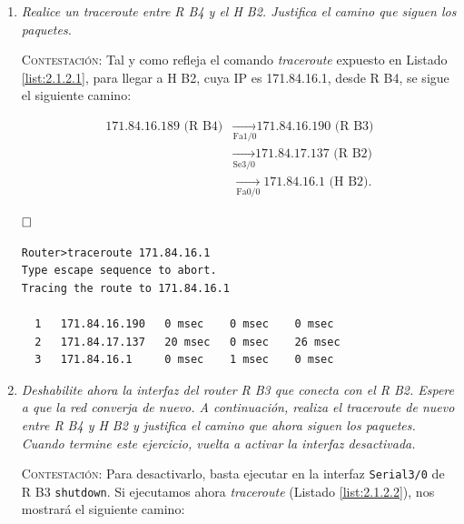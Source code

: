 \documentclass[twoside, 11pt]{article}
\begin{document}
\begin{enumerate}

    \item \textit{Realice un traceroute entre R B4 y el H B2. Justifica el camino que siguen los paquetes.}
\label{ej:2.1.2.1}

\vspace{7px}

\textsc{Contestación}: Tal y como refleja el comando \textit{traceroute} expuesto en Listado \ref{list:2.1.2.1}, para llegar a H B2, cuya IP es 171.84.16.1, desde R B4, se sigue el siguiente camino:

\begin{equation*}
    \begin{split}
        \text{171.84.16.189 (R B4)} &\xrightarrow[\text{Fa1/0}]{} \text{171.84.16.190 (R B3)} \\
        &\xrightarrow[\text{Se3/0}]{} \text{171.84.17.137 (R B2)} \\
        &\xrightarrow[\text{Fa0/0}]{} \text{171.84.16.1 (H B2)}.
    \end{split}
\end{equation*}

$\hfill\square$

\begin{center}
\begin{verbatim}
Router>traceroute 171.84.16.1
Type escape sequence to abort.
Tracing the route to 171.84.16.1

  1   171.84.16.190   0 msec    0 msec    0 msec    
  2   171.84.17.137   20 msec   0 msec    26 msec   
  3   171.84.16.1     0 msec    1 msec    0 msec    
\end{verbatim}
\label{list:2.1.2.1}
\end{center}

    \item \textit{Deshabilite ahora la interfaz del router R B3 que conecta con el R B2. Espere a que la red converja de nuevo. A continuación, realiza el traceroute de nuevo entre R B4 y H B2 y justifica el camino que ahora siguen los paquetes. Cuando termine este ejercicio, vuelta a activar la interfaz desactivada.}
    \label{ej:2.1.2.2}

\vspace{7px}

\textsc{Contestación}: 
Para desactivarlo, basta ejecutar en la interfaz \texttt{Serial3/0} de R B3 \texttt{shutdown}. Si ejecutamos ahora \textit{traceroute} (Listado \ref{list:2.1.2.2}), nos mostrará el siguiente camino:


\end{enumerate}
\end{document}
